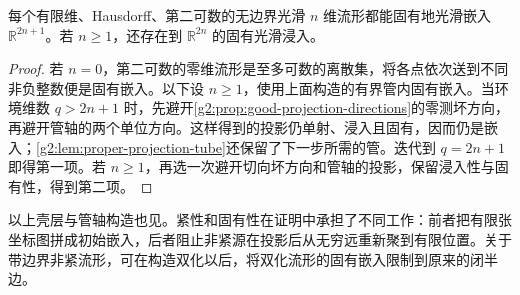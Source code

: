 \begin{theorem}\label{g2:thm:weak-whitney-proper}
	每个有限维、Hausdorff、第二可数的无边界光滑 \(n\) 维流形都能固有地光滑嵌入 \(\mathbb R^{2n+1}\)。若 \(n\ge1\)，还存在到 \(\mathbb R^{2n}\) 的固有光滑浸入。
\end{theorem}
\begin{proof}
	若 \(n=0\)，第二可数的零维流形是至多可数的离散集，将各点依次送到不同非负整数便是固有嵌入。以下设 \(n\ge1\)，使用上面构造的有界管内固有嵌入。当环境维数 \(q>2n+1\) 时，先避开\cref{g2:prop:good-projection-directions}的零测坏方向，再避开管轴的两个单位方向。这样得到的投影仍单射、浸入且固有，因而仍是嵌入；\cref{g2:lem:proper-projection-tube}还保留了下一步所需的管。迭代到 \(q=2n+1\) 即得第一项。若 \(n\ge1\)，再选一次避开切向坏方向和管轴的投影，保留浸入性与固有性，得到第二项。
\end{proof}

以上壳层与管轴构造也见\cite[第132--135页，引理6.13--6.14及定理6.15]{Lee2012Smooth}。紧性和固有性在证明中承担了不同工作：前者把有限张坐标图拼成初始嵌入，后者阻止非紧源在投影后从无穷远重新聚到有限位置。关于带边界非紧流形，可在构造双化以后，将双化流形的固有嵌入限制到原来的闭半边。
